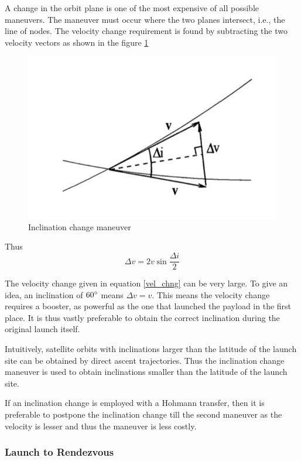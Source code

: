 \documentclass{article}
\theoremstyle{definition}
\begin{document}
A change in the orbit plane is one of the most expensive of all possible maneuvers. 
The maneuver must occur where the two planes intersect, i.e., the line of nodes.
The velocity change requirement is found by subtracting the two velocity vectors as shown in the figure \ref{fig:inc}

\begin{figure}[h]
    \centering
    \includegraphics[scale = 0.3]{image 6.jpeg}
    \caption{Inclination change maneuver}
    \label{fig:inc}
\end{figure}

Thus 
\begin{equation}\label{vel_chng}
    \Delta v = 2v \sin{\frac{\Delta i}{2}}
\end{equation}

The velocity change given in equation \ref{vel_chng} can be very large. To give an idea, an inclination of $60\degree$ means $\Delta v = v$. This means the velocity change requires a booster, as powerful as the one that launched the payload in the first place.
It is thus vastly preferable to obtain the correct inclination during the original launch itself.
\medskip

Intuitively, satellite orbits with inclinations larger than the latitude of the launch site can be obtained by direct ascent trajectories. Thus the inclination change maneuver is used to obtain inclinations smaller than the latitude of the launch site.

If an inclination change is employed with a Hohmann transfer, then it is preferable to postpone the inclination change till the second maneuver as the velocity is lesser and thus the maneuver is less costly. 

\subsubsection{Launch to Rendezvous}
\end{document}
